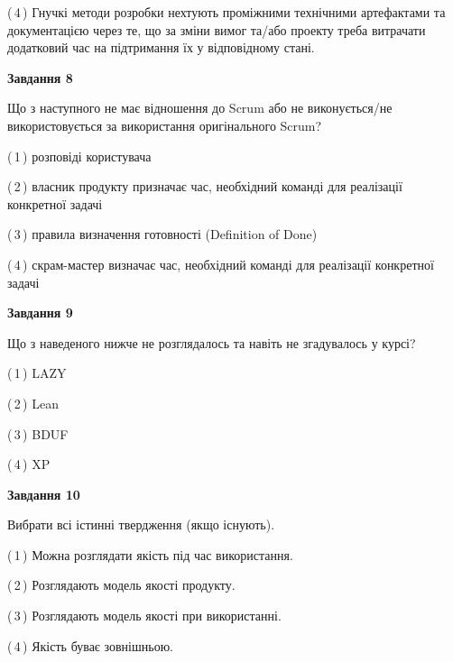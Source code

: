 \documentclass[10pt, ukrainian]{article}
\begin{document}
{\begin {large}
(\,4\,) Гнучкі методи розробки нехтують проміжними технічними артефактами та документацією через те, що за зміни вимог та/або проекту треба витрачати додатковий час на підтримання їх у відповідному стані. %


{\begin {center}\textbf{Завдання 8}\end {center}}\par
Що з наступного не має відношення до Scrum або не виконується/не використовується за використання оригінального Scrum?\par
\vspace{2mm}



(\,1\,) розповіді користувача%



(\,2\,) власник продукту призначає час, необхідний команді для реалізації конкретної задачі%



(\,3\,) правила визначення готовності (Definition of Done) %



(\,4\,) скрам-мастер визначає час, необхідний команді для реалізації конкретної задачі%


{\begin {center}\textbf{Завдання 9}\end {center}}\par
Що з наведеного нижче не розглядалось та навіть не згадувалось у курсі?\par
\vspace{2mm}



(\,1\,) LAZY%



(\,2\,) Lean%



(\,3\,) BDUF%



(\,4\,) XP%


{\begin {center}\textbf{Завдання 10}\end {center}}\par
Вибрати всі істинні твердження (якщо існують).\par
\vspace{2mm}



(\,1\,) Можна розглядати якість під час використання.%



(\,2\,) Розглядають модель якості продукту.%



(\,3\,) Розглядають модель якості при використанні.%



(\,4\,) Якість буває зовнішньою.%



\end {large}}
\end{document}
